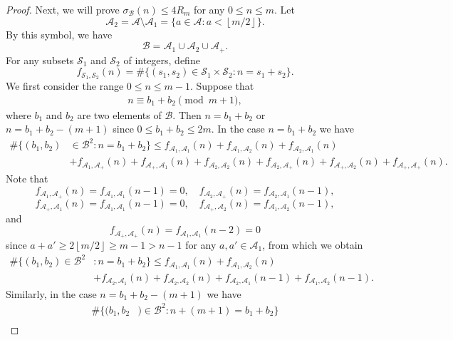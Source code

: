 \documentclass[10pt,a4paper]{amsart}
\newcommand{\floor}[1]{\left\lfloor #1\right\rfloor}
\begin{document}
\begin{proof}
Next, we will prove $\sigma_{\mathcal{B}}(n)\le 4R_m$ for any $0\le n\le m$. Let
$$
\mathcal{A}_{2}=\mathcal{A}\setminus\mathcal{A}_1=\big\{a\in \mathcal{A}: a< \floor{m/2}\big\}.
$$
By this symbol, we have
$$
\mathcal{B}=\mathcal{A}_1\cup \mathcal{A}_{2}\cup\mathcal{A}_{+}.
$$
For any subsets $\mathcal{S}_1$ and $\mathcal{S}_2$ of integers, define
$$
f_{\mathcal{S}_1,\mathcal{S}_2}(n)=\#\big\{(s_1,s_2)\in \mathcal{S}_1\times\mathcal{S}_2: n=s_1+s_2\big\}.
$$
We first consider the range $0\le n\le m-1$. Suppose that
\begin{align*}
    n\equiv b_1+b_2\pmod{m+1},
\end{align*}
where $b_1$ and $b_2$ are two elements of $\mathcal{B}$.
Then $n=b_1+b_2$ or $n=b_1+b_2-(m+1)$ since $0\le b_1+b_2\le 2m$. In the case $n=b_1+b_2$ we have
\begin{align*}
    \#\big\{(b_1, b_2)&\in \mathcal{B}^2 :  n=b_1 +b_2\big\}
    \le f_{\mathcal{A}_{1},\mathcal{A}_{1}}(n)+f_{\mathcal{A}_{1},\mathcal{A}_{2}}(n)+f_{\mathcal{A}_{2},\mathcal{A}_{1}}(n)\\
&+f_{\mathcal{A}_{1},\mathcal{A}_{+}}(n)+f_{\mathcal{A}_{+},\mathcal{A}_{1}}(n)+f_{\mathcal{A}_{2},\mathcal{A}_{2}}(n)+f_{\mathcal{A}_{2},\mathcal{A}_{+}}(n)+f_{\mathcal{A}_{+},\mathcal{A}_{2}}(n)+f_{\mathcal{A}_{+},\mathcal{A}_{+}}(n).
\end{align*}
Note that
$$
f_{\mathcal{A}_{1},\mathcal{A}_{+}}(n)=f_{\mathcal{A}_{1},\mathcal{A}_{1}}(n-1)=0,\quad f_{\mathcal{A}_{2},\mathcal{A}_{+}}(n)=f_{\mathcal{A}_{2},\mathcal{A}_{1}}(n-1),
$$
$$
f_{\mathcal{A}_{+},\mathcal{A}_{1}}(n)=f_{\mathcal{A}_{1},\mathcal{A}_{1}}(n-1)=0,\quad f_{\mathcal{A}_{+},\mathcal{A}_{2}}(n)=f_{\mathcal{A}_{1},\mathcal{A}_{2}}(n-1),
$$
and
$$
f_{\mathcal{A}_{+},\mathcal{A}_{+}}(n)=f_{\mathcal{A}_{1},\mathcal{A}_{1}}(n-2)=0
$$
since $a+a'\ge 2\floor{m/2}\ge m-1>n-1$ for any $a, a'\in \mathcal{A}_{1}$,
from which we obtain
\begin{align}\label{eq-proof-1}
    \#\big\{(b_1, b_2)\in \mathcal{B}^2& :  n=b_1 +b_2\big\}
    \le f_{\mathcal{A}_{1},\mathcal{A}_{1}}(n)+f_{\mathcal{A}_{1},\mathcal{A}_{2}}(n)\nonumber\\
    &+f_{\mathcal{A}_{2},\mathcal{A}_{1}}(n)+f_{\mathcal{A}_{2},\mathcal{A}_{2}}(n)+f_{\mathcal{A}_{2},\mathcal{A}_{1}}
    (n-1)+f_{\mathcal{A}_{1},\mathcal{A}_{2}}
    (n-1).
\end{align}
Similarly, in the case $n=b_1+b_2-(m+1)$ we have
\begin{align}\label{eq-proof-2}
    \#\big\{(b_1,b_2&)\in \mathcal{B}^2: n + (m+1)= b_1+b_2\big\}\nonumber\\

\end{align}
\end{proof}
\end{document}
